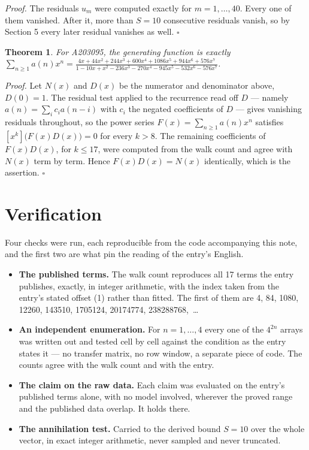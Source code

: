 \documentclass[11pt]{article}
\newtheorem{theorem}{Theorem}
\theoremstyle{definition}
\begin{document}
{\itshape Proof.} The residuals $u_m$ were computed exactly for $m = 1,\dots,40$. Every one of them vanished. After it, more than $S = 10$ consecutive residuals vanish, so by Section 5 every later residual vanishes as well. $\square$

\begin{theorem} For A203095, the generating function is exactly $\sum_{n\ge 1} a(n)x^n = \frac{4x + 44x^{2} + 244x^{3} + 600x^{4} + 1086x^{5} + 944x^{6} + 576x^{7}}{1 - 10x + x^{2} - 236x^{3} - 270x^{4} - 945x^{5} - 532x^{6} - 576x^{7}}$.\end{theorem}

{\itshape Proof.} Let $N(x)$ and $D(x)$ be the numerator and denominator above, $D(0)=1$. The residual test applied to the recurrence read off $D$ --- namely $a(n) = \sum_i c_i a(n-i)$ with $c_i$ the negated coefficients of $D$ --- gives vanishing residuals throughout, so the power series $F(x)=\sum_{n\ge 1}a(n)x^n$ satisfies $[x^k]\bigl(F(x)D(x)\bigr) = 0$ for every $k > 8$. The remaining coefficients of $F(x)D(x)$, for $k \le 17$, were computed from the walk count and agree with $N(x)$ term by term. Hence $F(x)D(x) = N(x)$ identically, which is the assertion. $\square$

\section{Verification}

Four checks were run, each reproducible from the code accompanying this note, and the first two are what pin the reading of the entry's English.

\begin{itemize}

\item {\bfseries The published terms.} The walk count reproduces all 17 terms the entry publishes, exactly, in integer arithmetic, with the index taken from the entry's stated offset (1) rather than fitted. The first of them are 4, 84, 1080, 12260, 143510, 1705124, 20174774, 238288768,~\dots

\item {\bfseries An independent enumeration.} For $n = 1,\dots,4$ every one of the $4^{2n}$ arrays was written out and tested cell by cell against the condition as the entry states it --- no transfer matrix, no row window, a separate piece of code. The counts agree with the walk count and with the entry.

\item {\bfseries The claim on the raw data.} Each claim was evaluated on the entry's published terms alone, with no model involved, wherever the proved range and the published data overlap. It holds there.

\item {\bfseries The annihilation test.} Carried to the derived bound $S = 10$ over the whole vector, in exact integer arithmetic, never sampled and never truncated.

\end{itemize}
\end{document}
